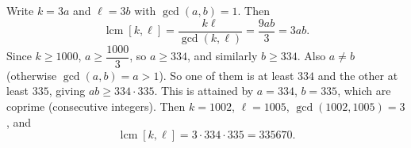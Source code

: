 Write $k=3a$ and $\ell=3b$ with $\gcd(a,b)=1$. Then
\[
\operatorname{lcm}[k,\ell]=\dfrac{k\ell}{\gcd(k,\ell)}=\dfrac{9ab}{3}=3ab .
\]
Since $k\ge1000$, $a\ge\dfrac{1000}{3}$, so $a\ge334$, and similarly $b\ge334$. Also $a\ne b$ (otherwise $\gcd(a,b)=a>1$). So one of them is at least $334$ and the other at least $335$, giving $ab\ge334\cdot335$. This is attained by $a=334$, $b=335$, which are coprime (consecutive integers). Then $k=1002$, $\ell=1005$, $\gcd(1002,1005)=3$, and
\[
\operatorname{lcm}[k,\ell]=3\cdot334\cdot335=\boxed{335670}.
\]
